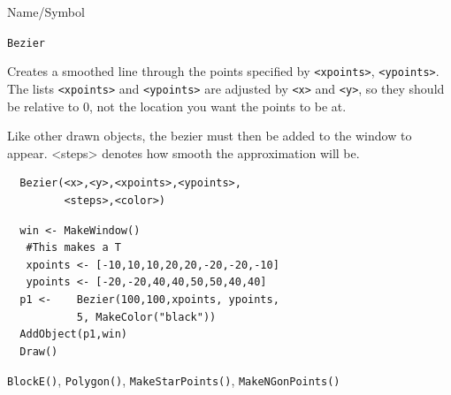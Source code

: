 \begin{desc}{Name/Symbol}
\item[Name/Symbol]  	\verb+Bezier+ 

\item[Description] Creates a smoothed line through the  points
specified by \verb+<xpoints>+, \verb+<ypoints>+. The lists \verb+<xpoints>+ and
\verb+<ypoints>+ are adjusted by  \verb+<x>+ and \verb+<y>+, so they
should be relative to 0, not the location you want the points to be at.

Like other drawn objects, the bezier must then be added to the window
to appear. <steps> denotes how smooth the approximation will be.

\item[Usage]		
\begin{verbatim}
  Bezier(<x>,<y>,<xpoints>,<ypoints>,
         <steps>,<color>)
\end{verbatim}

\item[Example]	
\begin{verbatim}
  win <- MakeWindow()
   #This makes a T
   xpoints <- [-10,10,10,20,20,-20,-20,-10]
   ypoints <- [-20,-20,40,40,50,50,40,40]
  p1 <-    Bezier(100,100,xpoints, ypoints,
           5, MakeColor("black"))
  AddObject(p1,win)
  Draw()
\end{verbatim}

\item[See Also]   
\verb+BlockE()+, \verb+Polygon()+, \verb+MakeStarPoints()+,
\verb+MakeNGonPoints()+
\end{desc}




